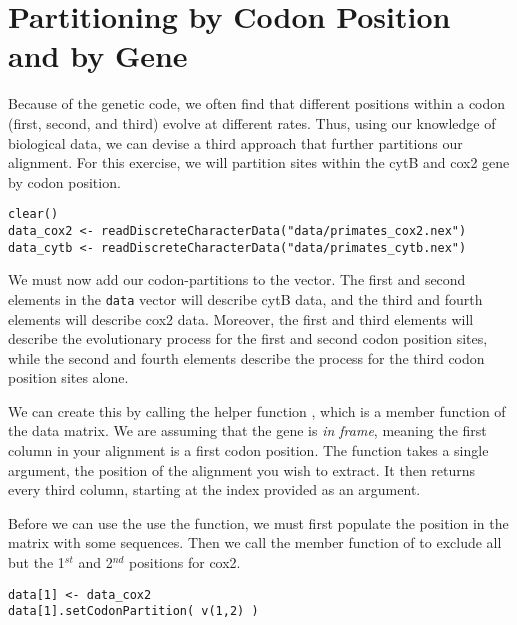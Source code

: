 \section{Partitioning by Codon Position and by Gene}\label{secExtremeP}

Because of the genetic code, we often find that different positions within a codon (first, second, and third) evolve at different rates.
Thus, using our knowledge of biological data, we can devise a third approach that further partitions our alignment. 
For this exercise, we will partition sites within the cytB and cox2 gene by codon position.

{\tt \begin{snugshade*}
\begin{lstlisting}
clear()
data_cox2 <- readDiscreteCharacterData("data/primates_cox2.nex")
data_cytb <- readDiscreteCharacterData("data/primates_cytb.nex")
\end{lstlisting}
\end{snugshade*}}

We must now add our codon-partitions to the  vector.
The first and second elements in the {\tt data} vector will describe cytB data, and the third and fourth elements will describe cox2 data.
Moreover, the first and third elements will describe the evolutionary process for the first and second codon position sites, while the second and fourth elements describe the process for the third codon position sites alone.

We can create this by calling the helper function , which is a member function of the data matrix. 
We are assuming that the gene is \textit{in frame}, meaning the first column in your alignment is a first codon position. 
The  function takes a single argument, the position of the alignment you wish to extract. 
It then returns every third column, starting at the index provided as an argument.

Before we can use the use the  function, we must first populate the position in the  matrix with some sequences. 
Then we call the member function of  to exclude all but the 1$^{st}$ and 2$^{nd}$ positions for cox2.
{\tt \begin{snugshade*}
\begin{lstlisting}
data[1] <- data_cox2
data[1].setCodonPartition( v(1,2) )
\end{lstlisting}
\end{snugshade*}}


